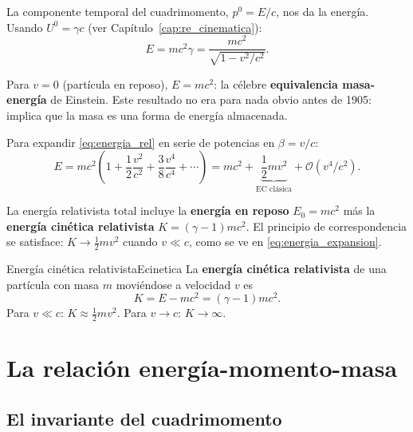 La componente temporal del cuadrimomento, $p^0 = E/c$, nos da la energía. Usando $U^0 = \gamma c$ (ver Capítulo~\ref{cap:re_cinematica}):
\begin{equation}
  E = mc^2\gamma = \frac{mc^2}{\sqrt{1-v^2/c^2}}.
  \label{eq:energia_rel}
\end{equation}

Para $v = 0$ (partícula en reposo), $E = mc^2$: la célebre \textbf{equivalencia masa-energía} de Einstein. Este resultado no era para nada obvio antes de 1905: implica que la masa es una forma de energía almacenada.

Para expandir \eqref{eq:energia_rel} en serie de potencias en $\beta = v/c$:
\begin{equation}
  E = mc^2\left(1 + \frac{1}{2}\frac{v^2}{c^2} + \frac{3}{8}\frac{v^4}{c^4} + \cdots\right)
  = mc^2 + \underbrace{\frac{1}{2}mv^2}_{\text{EC clásica}} + \mathcal{O}(v^4/c^2).
  \label{eq:energia_expansion}
\end{equation}

\begin{importante}
La energía relativista total incluye la \textbf{energía en reposo} $E_0 = mc^2$ más la \textbf{energía cinética relativista} $K = (\gamma - 1)mc^2$. El principio de correspondencia se satisface: $K \to \frac{1}{2}mv^2$ cuando $v \ll c$, como se ve en \eqref{eq:energia_expansion}.
\end{importante}

\begin{definicion}{Energía cinética relativista}{Ecinetica}
La \textbf{energía cinética relativista} de una partícula con masa $m$ moviéndose a velocidad $v$ es
\begin{equation}
  K = E - mc^2 = (\gamma - 1)mc^2.
  \label{eq:Ecinetica}
\end{equation}
Para $v \ll c$: $K \approx \frac{1}{2}mv^2$. Para $v \to c$: $K \to \infty$.
\end{definicion}

\section{La relación energía-momento-masa}

\subsection{El invariante del cuadrimomento}

